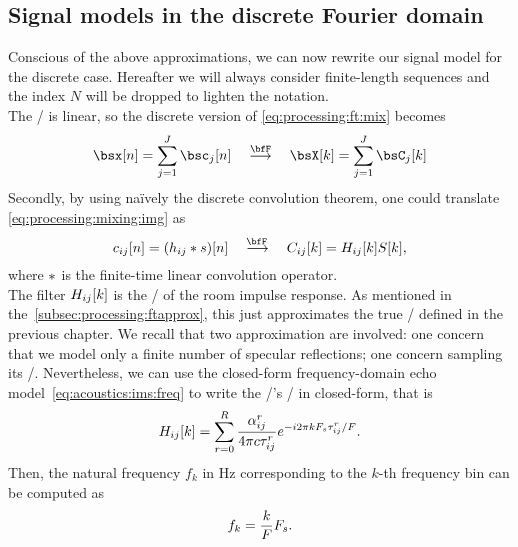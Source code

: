 \subsection{Signal models in the discrete Fourier domain}\label{sec:processing:fouriermodel}
Conscious of the above approximations, we can now rewrite our signal model for the discrete case.
Hereafter we will always consider finite-length sequences and the index $N$ will be dropped to lighten the notation.
\\The \DFT/ is linear, so the discrete version of \cref{eq:processing:ft:mix} becomes
\begin{equation}\label{eq:processing:dft:mix}
    {\mics}[ n] = \sum_{\idxSrc=1}^{\numSrcs} {\imgs}_\idxSrc[ n]
    \mathspace\overset{\discreteFT}{\kto}\mathspace
    {\MICS}[ k] = \sum_{\idxSrc=1}^{\numSrcs} {\IMGS}_\idxSrc[ k]
\end{equation}
Secondly, by using na\"ively the discrete convolution theorem, one could translate \cref{eq:processing:mixing:img} as
\begin{equation}\label{eq:processing:discreteModel}
    {\img}_{\idxMicSrc}[n] = ({\rir}_{\idxMicSrc} \convDis {\src})[n]
    \mathspace\overset{\discreteFT{}}{\kto}\mathspace
    {C}_{\idxMicSrc}[k] = {H}_{\idxMicSrc}[k] {S}[k]
    ,
\end{equation}
where $\ast$ is the finite-time linear convolution operator.
\\The filter ${H}_{ij}[k]$ is the \DFT/ of the room impulse response.
As mentioned in the~\cref{subsec:processing:ftapprox}, this just approximates the true \RTF/ defined in the previous chapter.
We recall that two approximation are involved: one concern that we model only a finite number of specular reflections; one concern sampling its \FT/.
Nevertheless, we can use the closed-form frequency-domain echo model~\cref{eq:acoustics:ims:freq} to write the \RTF/'s \DFT/ in closed-form, that is
\begin{equation}\label{eq:processing:discreteModel:rir}
    {H}_{ij}[ k] = \sum_{r=0}^{R}
                \frac{\alpha_{ij}^r}{4 \pi c \tau_{ij}^r}
                {e}^{- {i} 2 \pi k F_s \tau_{ij}^r / F}
    .
\end{equation}
Then, the natural frequency $f_k$ in $\si{\Hz}$ corresponding to the $k$-th frequency bin can be computed as
\begin{equation}\label{eq:processing:fk}
    f_k = \frac{k}{F}F_s
    .
\end{equation}

